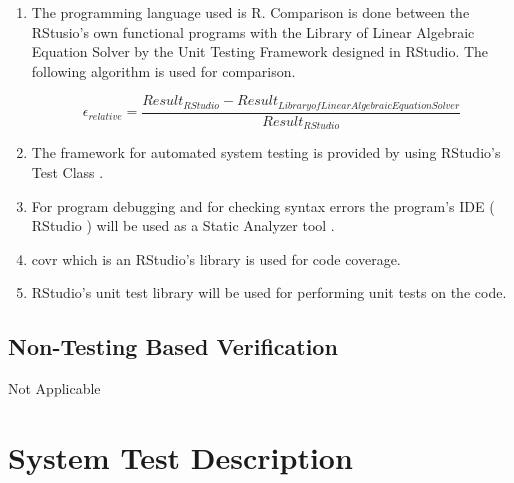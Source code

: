 \documentclass[12pt, titlepage]{article}
\begin{document}
\begin{enumerate}

\item The programming language used is R. Comparison is done between the
  RStusio's  own functional programs with the Library of Linear
  Algebraic Equation Solver by the Unit Testing Framework designed in
  RStudio. The following algorithm  is used for comparison.


\[\epsilon_{relative} = \frac{Result_{RStudio} - Result_{Library of Linear
Algebraic Equation Solver}}{Result_{RStudio}}\]


\item The framework for automated system testing is provided by using RStudio's Test Class .

\item For program debugging and for checking syntax errors the program's IDE (
RStudio ) will be used as a Static Analyzer tool . 

\item covr which is an RStudio's library is used for code coverage.

\item RStudio's unit test library will be used for performing unit tests on the code. 
\end{enumerate}



\subsection{Non-Testing Based Verification}
		
Not Applicable  

\section{System Test Description}
\end{document}

